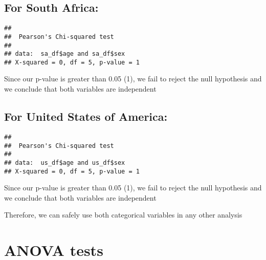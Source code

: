 \documentclass[
]{article}
\newenvironment{Shaded}{\begin{snugshade}}{\end{snugshade}}
\newcommand{\FunctionTok}[1]{\textcolor[rgb]{0.00,0.00,0.00}{#1}}
\newcommand{\NormalTok}[1]{#1}
\newcommand{\SpecialCharTok}[1]{\textcolor[rgb]{0.00,0.00,0.00}{#1}}
\begin{document}
\hypertarget{for-south-africa-2}{%
\subsection{For South Africa:}\label{for-south-africa-2}}

\begin{Shaded}
\end{Shaded}

\begin{verbatim}
## 
##  Pearson's Chi-squared test
## 
## data:  sa_df$age and sa_df$sex
## X-squared = 0, df = 5, p-value = 1
\end{verbatim}

Since our p-value is greater than 0.05 (1), we fail to reject the null
hypothesis and we conclude that both variables are independent

\hypertarget{for-united-states-of-america-2}{%
\subsection{For United States of
America:}\label{for-united-states-of-america-2}}

\begin{Shaded}
\end{Shaded}

\begin{verbatim}
## 
##  Pearson's Chi-squared test
## 
## data:  us_df$age and us_df$sex
## X-squared = 0, df = 5, p-value = 1
\end{verbatim}

Since our p-value is greater than 0.05 (1), we fail to reject the null
hypothesis and we conclude that both variables are independent

Therefore, we can safely use both categorical variables in any other
analysis

\hypertarget{anova-tests}{%
\section{ANOVA tests}\label{anova-tests}}
\end{document}
